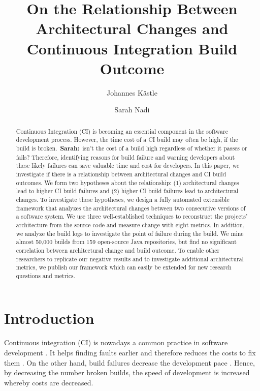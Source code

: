 \documentclass[sigplan, anonymous, review]{acmart}
\newcommand{\sn}[1]{{\color{blue}\textbf{Sarah:}~#1}}
\begin{document}
\title[Architectural Change vs CI Build Outcome]{On the Relationship Between Architectural Changes and Continuous Integration Build Outcome
}

\author{Johannes K{\"a}stle}

\author{Sarah Nadi}

\begin{abstract}
Continuous Integration (CI) is becoming an essential component in the software development process.
However, the time cost of a CI build may often be high, if the build is broken.~\sn{isn't the cost of a build high regardless of whether it passes or fails?}
Therefore, identifying reasons for build failure and warning developers about these likely failures can save valuable time and cost for developers.
In this paper, we investigate if there is a relationship between architectural changes and CI build outcomes.
We form two hypotheses about the relationship: (1) architectural changes lead to higher CI build failures and (2) higher CI build failures lead to architectural changes.
To investigate these hypotheses, we design a fully automated extensible framework that analyzes the architectural changes between two consecutive versions of a software system.
We use three well-established techniques to reconstruct the projects' architecture from the source code and measure change with eight metrics. 
In addition, we analyze the build logs to investigate the point of failure during the build. 
We mine almost 50,000 builds from 159 open-source Java repositories, but find no significant correlation between architectural change and build outcome. 
To enable other researchers to replicate our negative results and to investigate additional architectural metrics, we publish our framework which can easily be extended for new research questions and metrics.
\end{abstract}

\maketitle

\section{Introduction}

Continuous integration (CI) is nowadays a common practice in software development \cite{CI-Common}. It helps finding faults earlier and therefore reduces the costs to fix them \cite{NutzenCI}. On the other hand, build failures decrease the development pace \cite{Costs-BuildFailures}. Hence, by decreasing the number broken builds, the speed of development is increased whereby costs are decreased.
\end{document}
